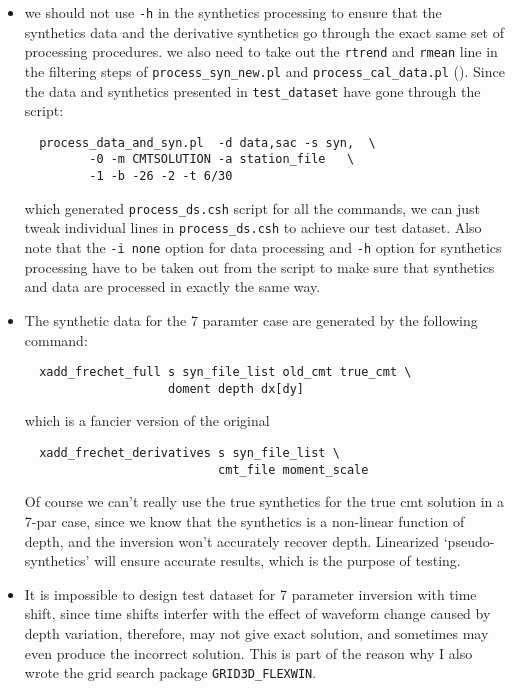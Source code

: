 \documentclass[12pt,titlepage,fleqn]{article}
\begin{document}
\begin{itemize}
\item  {} we should not use \verb=-h= in the synthetics processing to ensure that the synthetics data and the derivative synthetics go through the exact same set of processing procedures. we also need to take out the \verb=rtrend= and \verb=rmean= line in the filtering steps of \verb=process_syn_new.pl= and \verb=process_cal_data.pl= (). Since the data and synthetics presented in \verb=test_dataset= have gone through the script:
\begin{verbatim}
  process_data_and_syn.pl  -d data,sac -s syn,  \  
         -0 -m CMTSOLUTION -a station_file   \
         -1 -b -26 -2 -t 6/30
\end{verbatim}
which generated \verb=process_ds.csh= script for all the commands, we can just tweak individual lines in \verb=process_ds.csh= to achieve our test dataset. Also
note that the \verb=-i none= option for data processing and \verb=-h= option for synthetics processing have to be taken out from the script to make sure that synthetics and data are processed in exactly the same way.

\item The synthetic data for the 7 paramter case are generated by the following command:
\begin{verbatim} 
  xadd_frechet_full s syn_file_list old_cmt true_cmt \
                    doment depth dx[dy]
\end{verbatim}
which is a fancier version of the original
\begin{verbatim}
  xadd_frechet_derivatives s syn_file_list \
                           cmt_file moment_scale
\end{verbatim}
Of course we can't really use the true synthetics for the true cmt solution in a 7-par case, since we know that the synthetics is a non-linear function of depth, and the inversion won't accurately recover depth. Linearized `pseudo-synthetics' will ensure accurate results, which is the purpose of testing.

\item It is impossible to design test dataset for 7 parameter inversion with time shift, since time shifts interfer with the effect of waveform change caused by depth variation, therefore, may not give exact solution, and sometimes may even produce the incorrect solution. This is part of the reason why I also wrote the grid search package \verb=GRID3D_FLEXWIN=.
\end{itemize}
\end{document}
